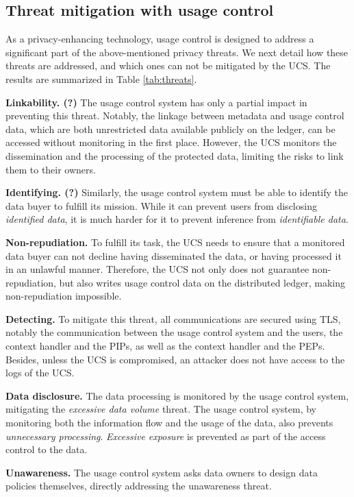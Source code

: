 \subsection{Threat mitigation with usage control}
\label{ss_mitigation}

As a privacy-enhancing technology, usage control is designed to address a significant part of the above-mentioned privacy threats. We next detail how these threats are addressed, and which ones can not be mitigated by the UCS. The results are summarized in Table \ref{tab:threats}.


\textbf{Linkability. (?)}
The usage control system has only a partial impact in preventing this threat. Notably, the linkage between metadata and usage control data, which are both unrestricted data available publicly on the ledger, can be accessed without monitoring in the first place. However, the UCS monitors the dissemination and the processing of the protected data, limiting the risks to link them to their owners.

\textbf{Identifying. (?)} Similarly, the usage control system must be able to identify the data buyer to fulfill its mission. While it can prevent users from disclosing \emph{identified data}, it is much harder for it to prevent inference from \emph{identifiable data}.

\textbf{Non-repudiation. \xmark}  To fulfill its task, the UCS needs to ensure that a monitored data buyer can not decline having disseminated the data, or having processed it in an unlawful manner. Therefore, the UCS not only does not guarantee non-repudiation, but also writes usage control data on the distributed ledger, making non-repudiation impossible.

\textbf{Detecting. \cmark} To mitigate this threat, all communications are secured using TLS, notably the communication between the usage control system and the users, the context handler and the PIPs, as well as the context handler and the PEPs. Besides, unless the UCS is compromised, an attacker does not have access to the logs of the UCS.

\textbf{Data disclosure. \cmark} The data processing is monitored by the usage control system, mitigating the \emph{excessive data volume} threat. The usage control system, by monitoring both the information flow and the usage of the data, also prevents \emph{unnecessary processing}. \emph{Excessive exposure} is prevented as part of the access control to the data.

\textbf{Unawareness. \cmark} The usage control system asks data owners to design data policies themselves, directly addressing the unawareness threat.

